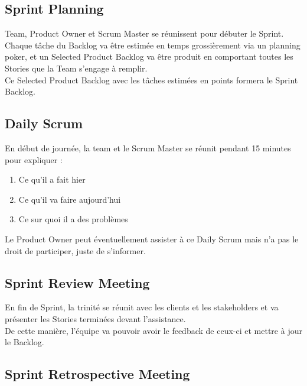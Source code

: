 \documentclass{report}
\begin{document}
		\subsection{Sprint Planning}

			Team, Product Owner et Scrum Master se réunissent pour débuter le Sprint.\\
			Chaque tâche du Backlog va être estimée en temps grossièrement via un planning poker, et un Selected Product Backlog va être produit en comportant toutes les Stories que la Team s'engage à remplir.\\

			Ce Selected Product Backlog avec les tâches estimées en points formera le Sprint Backlog.\\

		\subsection{Daily Scrum}

			En début de journée, la team et le Scrum Master se réunit pendant 15 minutes pour expliquer : 

			\begin{enumerate}
				\item Ce qu'il a fait hier
				\item Ce qu'il va faire aujourd'hui
				\item Ce sur quoi il a des problèmes
			\end{enumerate}

			Le Product Owner peut éventuellement assister à ce Daily Scrum mais n'a pas le droit de participer, juste de s'informer.\\

		\subsection{Sprint Review Meeting}

			En fin de Sprint, la trinité se réunit avec les clients et les stakeholders et va présenter les Stories terminées devant l'assistance.\\

			De cette manière, l'équipe va pouvoir avoir le feedback de ceux-ci et mettre à jour le Backlog.\\

		\subsection{Sprint Retrospective Meeting}
\end{document}
